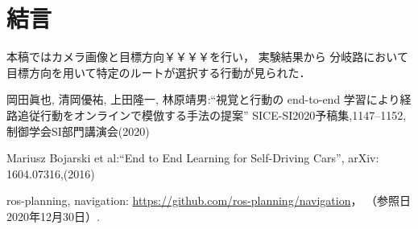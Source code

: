 \documentclass[10pt]{jarticle}
\begin{document}
        
    \section{結\hspace{2zw}言}%
    本稿ではカメラ画像と目標方向￥￥￥￥を行い，
    実験結果から
    分岐路において目標方向を用いて特定のルートが選択する行動が見られた．
    
    \vspace{5truemm}
    {\footnotesize
        \begin{thebibliography}{99}
            
            
            岡田眞也, 清岡優祐, 上田隆一, 林原靖男:``視覚と行動の end-to-end 
            学習により経路追従行動をオンラインで模倣する手法の提案''
            SICE-SI2020予稿集,1147--1152,制御学会SI部門講演会(2020)
            
            Mariusz Bojarski et al:``End to End Learning for Self-Driving Cars'',
            arXiv: 1604.07316,(2016)
            
            
            
            ros-planning, navigation: 
            \url{https://github.com/ros-planning/navigation}， 
            （参照日 2020年12月30日）. 
            
        \end{thebibliography}
    }
    \normalsize
    
\end{document}
